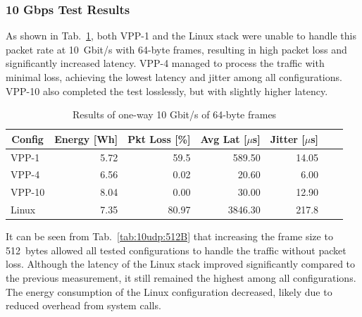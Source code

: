 \subsubsection{10 Gbps Test Results}

As shown in Tab.~\ref{tab:10udp:64B}, both VPP-1 and the Linux stack were unable to handle this packet rate at 10~Gbit/s with 64-byte frames, resulting in high packet loss and significantly increased latency. 
VPP-4 managed to process the traffic with minimal loss, achieving the lowest latency and jitter among all configurations. 
VPP-10 also completed the test losslessly, but with slightly higher latency. 

\begin{table}[h!]
\centering
\caption{Results of one-way 10 Gbit/s of 64-byte frames}
\begin{tabular}{|l|r|r|r|r|r|r|}
\hline
\multicolumn{1}{|c|}{\textbf{Config}} &
\multicolumn{1}{c|}{\textbf{Energy [Wh] }} &
\multicolumn{1}{c|}{\textbf{Pkt Loss [\%]}} &
\multicolumn{1}{c|}{\textbf{Avg Lat [$\mu$s]}} &
\multicolumn{1}{c|}{\textbf{Jitter [$\mu$s]}} \\
\hline 
VPP-1 & 5.72 & 59.5 & 589.50 & 14.05 \\
VPP-4 & 6.56 & 0.02 & 20.60 & 6.00 \\
VPP-10 & 8.04 & 0.00 & 30.00 & 12.90 \\
Linux & 7.35 & 80.97 & 3846.30 & 217.8 \\
\hline
\end{tabular}
\label{tab:10udp:64B}
\end{table}

It can be seen from Tab.~\ref{tab:10udp:512B} that increasing the frame size to 512~bytes allowed all tested configurations to handle the traffic without packet loss. 
Although the latency of the Linux stack improved significantly compared to the previous measurement, it still remained the highest among all configurations.
The energy consumption of the Linux configuration decreased, likely due to reduced overhead from system calls.

